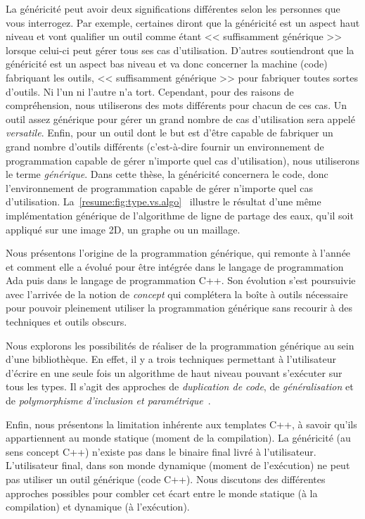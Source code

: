 La généricité peut avoir deux significations différentes selon les personnes que vous interrogez. Par exemple, certaines
diront que la généricité est un aspect haut niveau et vont qualifier un outil comme étant << suffisamment générique >>
lorsque celui-ci peut gérer tous ses cas d'utilisation. D'autres soutiendront que la généricité est un aspect bas niveau
et va donc concerner la machine (code) fabriquant les outils, << suffisamment générique >> pour fabriquer toutes sortes
d'outils. Ni l'un ni l'autre n'a tort. Cependant, pour des raisons de compréhension, nous utiliserons des mots
différents pour chacun de ces cas. Un outil assez générique pour gérer un grand nombre de cas d'utilisation sera appelé
\emph{versatile}. Enfin, pour un outil dont le but est d'être capable de fabriquer un grand nombre d'outils différents
(c'est-à-dire fournir un environnement de programmation capable de gérer n'importe quel cas d'utilisation), nous
utiliserons le terme \emph{générique}. Dans cette thèse, la généricité concernera le code, donc l'environnement de
programmation capable de gérer n'importe quel cas d'utilisation.
La~\cref{resume:fig:type.vs.algo}~\parencite{levillain.2011.phd} illustre le résultat d'une même implémentation
générique de l'algorithme de ligne de partage des eaux, qu'il soit appliqué sur une image 2D, un graphe ou un maillage.

Nous présentons l'origine de la programmation générique, qui remonte à l'année~ et
comment elle a évolué pour être intégrée dans le langage de programmation Ada puis dans le langage de programmation C++.
Son évolution s'est poursuivie avec l'arrivée de la notion de \emph{concept} qui complétera la boîte à outils nécessaire
pour pouvoir pleinement utiliser la programmation générique sans recourir à des techniques et outils obscurs.

Nous explorons les possibilités de réaliser de la programmation générique au sein d'une bibliothèque. En effet, il y a
trois techniques permettant à l'utilisateur d'écrire en une seule fois un algorithme de haut niveau pouvant s'exécuter
sur tous les types. Il s'agit des approches de \emph{duplication de code}, de \emph{généralisation} et de
\emph{polymorphisme d'inclusion et paramétrique}~\parencite{gibbons.2007.datatype}.

Enfin, nous présentons la limitation inhérente aux templates C++, à savoir qu'ils appartiennent au monde statique
(moment de la compilation). La généricité (au sens concept C++) n'existe pas dans le binaire final livré à
l'utilisateur. L'utilisateur final, dans son monde dynamique (moment de l'exécution) ne peut pas utiliser un outil
générique (code C++). Nous discutons des différentes approches possibles pour combler cet écart entre le monde statique
(à la compilation) et dynamique (à l'exécution).

